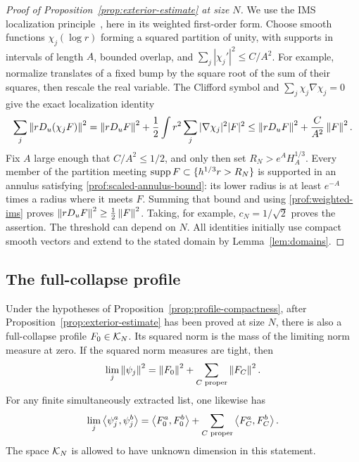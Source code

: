 \begin{proof}[Proof of Proposition~\ref{prop:exterior-estimate} at size \(N\)]
We use the IMS localization principle~\cite[Lemma~3.1]{Simon1983},
here in its weighted first-order form. Choose smooth functions
\(\chi_j(\log r)\) forming a squared partition of
unity, with supports in intervals of length \(A\), bounded overlap, and
\(\sum_j|\chi_j'|^2\le C/A^2\). For example, normalize translates of a
fixed bump by the square root of the sum of their squares, then rescale
the real variable. The Clifford symbol and
\(\sum_j\chi_j\nabla\chi_j=0\) give the exact localization identity
\begin{equation}\label{prof:weighted-ims}
 \sum_j\left\lVert rD_u(\chi_jF)\right\rVert^2
 =\left\lVert rD_uF\right\rVert^2+
     \frac12\int r^2\sum_j|\nabla\chi_j|^2|F|^2
 \le\left\lVert rD_uF\right\rVert^2+\frac{C}{A^2}\left\lVert F\right\rVert^2.
\end{equation}
Fix \(A\) large enough that \(C/A^2\le1/2\), and only then set
\(R_N>e^AH_A^{1/3}\). Every member of the partition meeting
\(\operatorname{supp} F\subset\{h^{1/3}r>R_N\}\) is supported in an annulus satisfying
\eqref{prof:scaled-annulus-bound}: its lower radius is at least \(e^{-A}\)
times a radius where it meets \(F\). Summing that bound and using
\eqref{prof:weighted-ims} proves
\(\left\lVert rD_uF\right\rVert^2\ge\tfrac12\left\lVert F\right\rVert^2\). Taking, for example,
\(c_N=1/\sqrt2\) proves the assertion. The threshold can depend on \(N\).
All identities initially use compact smooth vectors and extend to the
stated domain by Lemma~\ref{lem:domains}.
\end{proof}

\subsection{The full-collapse profile}

\begin{corollary}
\label{prof:full-exhaustion}
Under the hypotheses of Proposition~\ref{prop:profile-compactness}, after
Proposition~\ref{prop:exterior-estimate} has been proved at size \(N\),
there is also a full-collapse profile \(F_0\in\mathcal K_N\). Its squared norm is
the mass of the limiting norm measure at zero. If the squared norm
measures are tight, then
\begin{equation}\label{prof:full-norm-exhaustion}
 \lim_j\left\lVert \psi_j\right\rVert^2
       =\left\lVert F_0\right\rVert^2+\sum_{C\text{ proper}}\left\lVert F_C\right\rVert^2.
\end{equation}
For any finite simultaneously extracted list, one likewise has
\begin{equation}\label{prof:polarized-exhaustion}
 \lim_j\left\langle \psi_j^a,\psi_j^b\right\rangle
 =\left\langle F_0^a,F_0^b\right\rangle+
       \sum_{C\text{ proper}}\left\langle F_C^a,F_C^b\right\rangle.
\end{equation}
The space \(\mathcal K_N\) is allowed to have unknown dimension in this statement.
\end{corollary}

